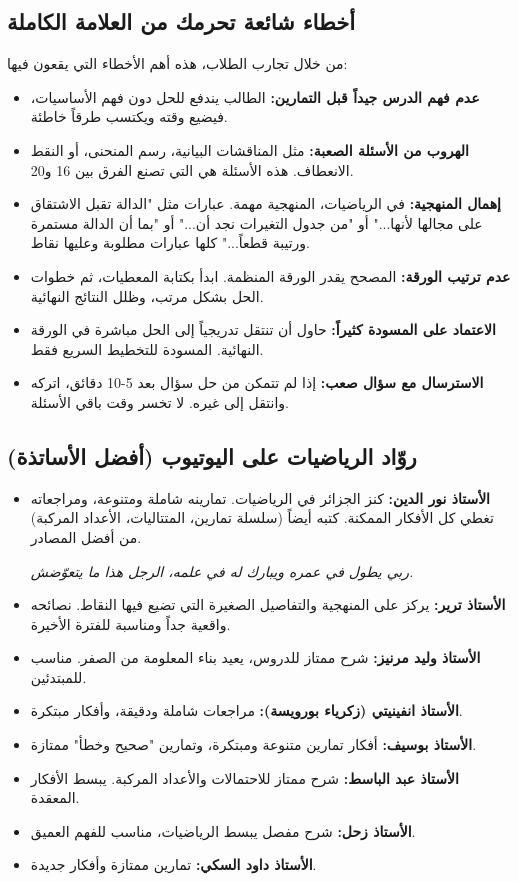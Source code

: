 \documentclass[12pt,a4paper]{book}
\newcommand{\quoteAr}[1]{%
	\begin{myquote}
		\itshape #1
	\end{myquote}
}
\begin{document}
	\subsection{أخطاء شائعة تحرمك من العلامة الكاملة}
	من خلال تجارب الطلاب، هذه أهم الأخطاء التي يقعون فيها:
	\begin{itemize}
		\item \textbf{عدم فهم الدرس جيداً قبل التمارين:} الطالب يندفع للحل دون فهم الأساسيات، فيضيع وقته ويكتسب طرقاً خاطئة.
		\item \textbf{الهروب من الأسئلة الصعبة:} مثل المناقشات البيانية، رسم المنحنى، أو النقط الانعطاف. هذه الأسئلة هي التي تصنع الفرق بين 16 و20.
		\item \textbf{إهمال المنهجية:} في الرياضيات، المنهجية مهمة. عبارات مثل "الدالة تقبل الاشتقاق على مجالها لأنها..." أو "من جدول التغيرات نجد أن..." أو "بما أن الدالة مستمرة ورتيبة قطعاً..." كلها عبارات مطلوبة وعليها نقاط.
		\item \textbf{عدم ترتيب الورقة:} المصحح يقدر الورقة المنظمة. ابدأ بكتابة المعطيات، ثم خطوات الحل بشكل مرتب، وظلل النتائج النهائية.
		\item \textbf{الاعتماد على المسودة كثيراً:} حاول أن تنتقل تدريجياً إلى الحل مباشرة في الورقة النهائية. المسودة للتخطيط السريع فقط.
		\item \textbf{الاسترسال مع سؤال صعب:} إذا لم تتمكن من حل سؤال بعد 5-10 دقائق، اتركه وانتقل إلى غيره. لا تخسر وقت باقي الأسئلة.
	\end{itemize}
	
	\subsection{روّاد الرياضيات على اليوتيوب (أفضل الأساتذة)}
	\begin{itemize}
		\item \textbf{الأستاذ نور الدين:} كنز الجزائر في الرياضيات. تمارينه شاملة ومتنوعة، ومراجعاته تغطي كل الأفكار الممكنة. كتبه أيضاً (سلسلة تمارين، المتتاليات، الأعداد المركبة) من أفضل المصادر. \quoteAr{ربي يطول في عمره ويبارك له في علمه، الرجل هذا ما يتعوّضش.}
		\item \textbf{الأستاذ ترير:} يركز على المنهجية والتفاصيل الصغيرة التي تضيع فيها النقاط. نصائحه واقعية جداً ومناسبة للفترة الأخيرة.
		\item \textbf{الأستاذ وليد مرنيز:} شرح ممتاز للدروس، يعيد بناء المعلومة من الصفر. مناسب للمبتدئين.
		\item \textbf{الأستاذ انفينيتي (زكرياء بورويسة):} مراجعات شاملة ودقيقة، وأفكار مبتكرة.
		\item \textbf{الأستاذ بوسيف:} أفكار تمارين متنوعة ومبتكرة، وتمارين "صحيح وخطأ" ممتازة.
		\item \textbf{الأستاذ عبد الباسط:} شرح ممتاز للاحتمالات والأعداد المركبة. يبسط الأفكار المعقدة.
		\item \textbf{الأستاذ زحل:} شرح مفصل يبسط الرياضيات، مناسب للفهم العميق.
		\item \textbf{الأستاذ داود السكي:} تمارين ممتازة وأفكار جديدة.
	\end{itemize}
	
\end{document}
